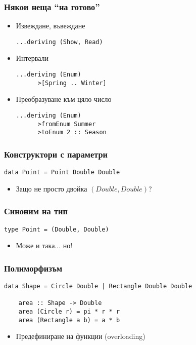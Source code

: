 \documentclass{beamer}
\begin{document}
\begin{frame}[fragile]
  \frametitle{Някои неща ``на готово''}

\begin{itemize}
  \item Извеждане, въвеждане
  \begin{lstlisting}[basicstyle=\small]
      ...deriving (Show, Read)
  \end{lstlisting}
  \item Интервали
  \begin{lstlisting}[basicstyle=\small]
      ...deriving (Enum)
      >[Spring .. Winter]
  \end{lstlisting}
  \item Преобразуване към цяло число
  \begin{lstlisting}[basicstyle=\small]
      ...deriving (Enum)
      >fromEnum Summer
      >toEnum 2 :: Season
  \end{lstlisting}
\end{itemize}

\end{frame}

\begin{frame}[fragile]
  \frametitle{Конструктори с параметри}

  \begin{lstlisting}[basicstyle=\small]
    data Point = Point Double Double
  \end{lstlisting}

\begin{itemize}
  \item Защо не просто двойка $(Double, Double)$?
\end{itemize}

\end{frame}


\begin{frame}[fragile]
  \frametitle{Синоним на тип}

  \begin{lstlisting}[basicstyle=\small]
    type Point = (Double, Double)
  \end{lstlisting}

\begin{itemize}
  \item Може и така... но!
\end{itemize}

\end{frame}


\begin{frame}[fragile]
  \frametitle{Полиморфизъм}

  \begin{lstlisting}[basicstyle=\small]
    data Shape = Circle Double | Rectangle Double Double

    area :: Shape -> Double
    area (Circle r) = pi * r * r
    area (Rectangle a b) = a * b
  \end{lstlisting}

\begin{itemize}
  \item Предефиниране на функции (overloading)
\end{itemize}

\end{frame}
\end{document}
